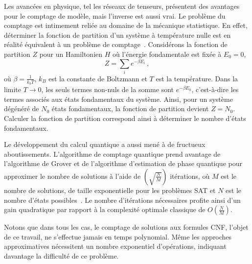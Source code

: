 Les avancées en physique, tel les réseaux de tenseurs, présentent des avantages pour le comptage de modèle, mais l'inverse est aussi vrai. Le problème du comptage est intimement reliée au domaine de la mécanique statistique. En effet, déterminer la fonction de partition d'un système à température nulle est en réalité équivalent à un problème de comptage~\cite{timmeCountingComplexDisordered2009}. Considérons la fonction de partition $Z$ pour un Hamiltonien $H$ où l'énergie fondamentale est fixée à $E_{0} = 0$,
\begin{equation}
    Z = \sum_{i} e^{-\beta E_{i}} \,,
\end{equation}
où $\beta = \frac{1}{k_{b} T}$, $k_{B}$ est la constante de Boltzmann et $T$ est la température. Dans la limite $T \to 0$, les seuls termes non-nuls de la somme sont $e^{-\beta E_{0}}$, c'est-à-dire les termes associés aux états fondamentaux du système. Ainsi, pour un système dégénéré de $N_{0}$ états fondamentaux, la fonction de partition devient $Z = N_{0}$. Calculer la fonction de partition correspond ainsi à déterminer le nombre d'états fondamentaux.

Le développement du calcul quantique a aussi mené à de fructueux aboutissements. L'algorithme de comptage quantique prend avantage de l'algorithme de Grover et de l'algorithme d'estimation de phase quantique pour approximer le nombre de solutions à l'aide de $(\sqrt{\frac{N}{M}})$ itérations, où $M$ est le nombre de solutions, de taille exponentielle pour les problèmes SAT et $N$ est le nombre d'états possibles~\cite{brassardQuantumCounting1998}. Le nombre d'itérations nécessaires profite ainsi d'un gain quadratique par rapport à la complexité optimale classique de $O(\frac{N}{M})$.

Notons que dans tous les cas, le comptage de solutions aux formules CNF, l'objet de ce travail, ne s'effectue jamais en temps polynomial. Même les approches approximatives nécessitent un nombre exponentiel d'opérations, indiquant davantage la difficulté de ce problème.






